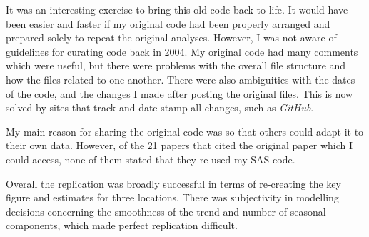It was an interesting exercise to bring this old code back to life. It would have been easier and faster if my original code had been properly arranged and prepared solely to repeat the original analyses. However, I was not aware of guidelines for curating code back in 2004. My original code had many comments which were useful, but there were problems with the overall file structure and how the files related to one another. There were also ambiguities with the dates of the code, and the changes I made after posting the original files. This is now solved by sites that track and date-stamp all changes, such as \textit{GitHub}.

My main reason for sharing the original code was so that others could adapt it to their own data. However, of the 21 papers that cited the original paper which I could access, none of them stated that they re-used my SAS code. 


Overall the replication was broadly successful in terms of re-creating the key figure and estimates for three locations. There was subjectivity in modelling decisions concerning the smoothness of the trend and number of seasonal components, which made perfect replication difficult.


